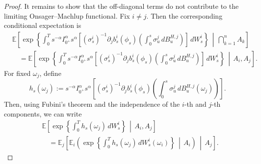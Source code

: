 \documentclass[preprint,12pt]{elsarticle}
\theoremstyle{definition}
\theoremstyle{plain}
\begin{document}
\begin{proof}
It remains to show that the off-diagonal terms do not contribute to the
limiting Onsager--Machlup functional. Fix \(i\neq j\). Then the corresponding
conditional expectation is
\begin{align*}
&\mathbb E
\left[
\exp\left\{
\int_0^T
s^{-\alpha}I_{0^+}^{\alpha}s^\alpha
\left[
    (\sigma_s^i)^{-1}
    \partial_j b_s^i(\phi_s)
    \left(
        \int_0^s \sigma_u^j\,dB_u^{H,j}
    \right)
\right]
\,dW_s^i
\right\}
\,\middle|\,
\bigcap_{k=1}^n A_k
\right]
\nonumber \\
&\quad =
\mathbb E
\left[
\exp\left\{
\int_0^T
s^{-\alpha}I_{0^+}^{\alpha}s^\alpha
\left[
    (\sigma_s^i)^{-1}
    \partial_j b_s^i(\phi_s)
    \left(
        \int_0^s \sigma_u^j\,dB_u^{H,j}
    \right)
\right]
\,dW_s^i
\right\}
\,\middle|\,
A_i,A_j
\right].
\end{align*}
For fixed \(\omega_j\), define
\[
    h_s(\omega_j)
    :=
    s^{-\alpha}I_{0^+}^{\alpha}s^\alpha
    \left[
        (\sigma_s^i)^{-1}
        \partial_j b_s^i(\phi_s)
        \left(
            \int_0^s \sigma_u^j\,dB_u^{H,j}(\omega_j)
        \right)
    \right].
\]
Then, using Fubini's theorem and the independence of the \(i\)-th and
\(j\)-th components, we can write
\begin{align*}
&\mathbb E
\left[
\exp\left\{
    \int_0^T h_s(\omega_j)\,dW_s^i
\right\}
\,\middle|\,
A_i,A_j
\right]
\nonumber \\
&\quad =
\mathbb E_j
\left[
\mathbb E_i
\left(
\exp\left\{
    \int_0^T h_s(\omega_j)\,dW_s^i(\omega_i)
\right\}
\,\middle|\,
A_i
\right)
\,\middle|\,
A_j
\right].
\end{align*}


\end{proof}
\end{document}
